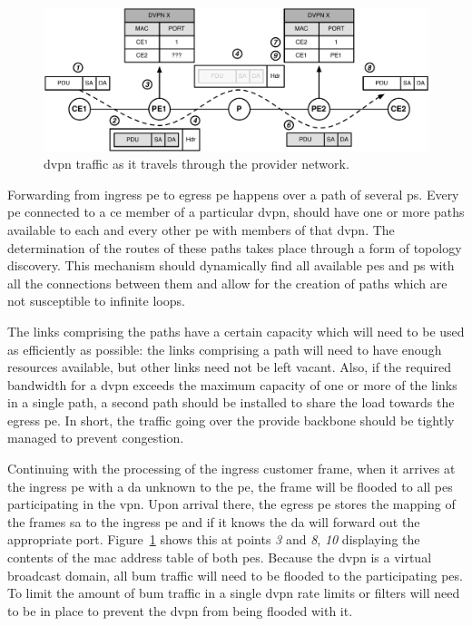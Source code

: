\begin{figure}[!h]
	\centering
	\includegraphics[width=14cm]{./includes/vpn-traffic.pdf}
	\caption{\ac{dvpn} traffic as it travels through the provider network.}
	\label{fig:vpn-traffic}
\end{figure}

Forwarding from ingress \ac{pe} to egress \ac{pe} happens over a path of several \acp{p}. Every \ac{pe} connected to a \ac{ce} member of a particular \ac{dvpn}, should have one or more paths available to each and every other \ac{pe} with members of that \ac{dvpn}. The determination of the routes of these paths takes place through a form of topology discovery. This mechanism should dynamically find all available \acp{pe} and \acp{p} with all the connections between them and allow for the creation of paths which are not susceptible to infinite loops.

The links comprising the paths have a certain capacity which will need to be used as efficiently as possible: the links comprising a path will need to have enough resources available, but other links need not be left vacant. Also, if the required bandwidth for a \ac{dvpn} exceeds the maximum capacity of one or more of the links in a single path, a second path should be installed to share the load towards the egress \ac{pe}. In short, the traffic going over the provide backbone should be tightly managed to prevent congestion. 

Continuing with the processing of the ingress customer frame, when it arrives at the ingress \ac{pe} with a \ac{da} unknown to the \ac{pe}, the frame will be flooded to all \acp{pe} participating in the \ac{vpn}. Upon arrival there, the egress \ac{pe} stores the mapping of the frames \ac{sa} to the ingress \ac{pe} and if it knows the \ac{da} will forward out the appropriate port. Figure~\ref{fig:vpn-traffic} shows this at points \textsl{3} and \textsl{8}, \textsl{10} displaying the contents of the \ac{mac} address table of both \acp{pe}. Because the \ac{dvpn} is a virtual broadcast domain, all \ac{bum} traffic will need to be flooded to the participating \acp{pe}. To limit the amount of \ac{bum} traffic in a single \ac{dvpn} rate limits or filters will need to be in place to prevent the \ac{dvpn} from being flooded with it.

